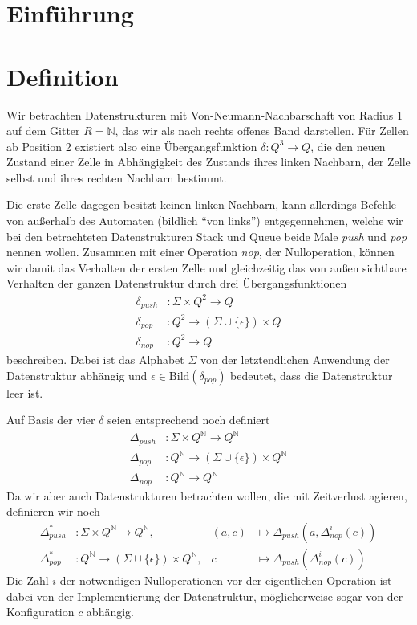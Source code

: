 \documentclass{article}
\begin{document}
\newcommand{\ca}{\ensuremath\mathcal{A}}
\newcommand{\abs}[1]{\lvert#1\rvert}
\newcommand{\ceil}[1]{\lceil#1\rceil}
\newcommand{\zrange}[1]{\mathbb{G}_{#1}}
\newcommand{\bild}[1]{\text{Bild}(#1)}
\newcommand{\N}{\mathbb{N}}

\section{Einführung}

\section{Definition}
Wir betrachten Datenstrukturen mit Von-Neumann-Nachbarschaft von Radius 1 auf dem Gitter $R = \N$, das wir als nach rechts offenes Band darstellen. Für Zellen ab Position 2 existiert also eine Übergangsfunktion $\delta : Q^3 \rightarrow Q$, die den neuen Zustand einer Zelle in Abhängigkeit des Zustands ihres linken Nachbarn, der Zelle selbst und ihres rechten Nachbarn bestimmt.

Die erste Zelle dagegen besitzt keinen linken Nachbarn, kann allerdings Befehle von außerhalb des Automaten (bildlich "`von links"') entgegennehmen, welche wir bei den betrachteten Datenstrukturen Stack und Queue beide Male \emph{push} und \emph{pop} nennen wollen. Zusammen mit einer Operation \emph{nop}, der Nulloperation, können wir damit das Verhalten der ersten Zelle und gleichzeitig das von außen sichtbare Verhalten der ganzen Datenstruktur durch drei Übergangsfunktionen
\begin{align*}
    \delta_{push} &: \Sigma \times Q^2 \rightarrow Q \\
    \delta_{pop} &: Q^2 \rightarrow (\Sigma \cup \{\epsilon\}) \times Q  \\
    \delta_{nop} &: Q^2 \rightarrow Q
\end{align*}
beschreiben. Dabei ist das Alphabet $\Sigma$ von der letztendlichen Anwendung der Datenstruktur abhängig und $\epsilon \in \bild{\delta_{pop}}$ bedeutet, dass die Datenstruktur leer ist.

Auf Basis der vier $\delta$ seien entsprechend noch definiert
\begin{align*}
    \Delta_{push} &: \Sigma \times Q^\N \rightarrow Q^\N \\
    \Delta_{pop} &: Q^\N \rightarrow (\Sigma \cup \{\epsilon\}) \times Q^\N \\
    \Delta_{nop} &: Q^\N \rightarrow Q^\N
\end{align*}
Da wir aber auch Datenstrukturen betrachten wollen, die mit Zeitverlust agieren, definieren wir noch
\begin{align*}
    \Delta^*_{push} &: \Sigma \times Q^\N \rightarrow Q^\N,& (a,c) &\mapsto \Delta_{push}(a,\Delta^i_{nop}(c)) \\
    \Delta^*_{pop} &: Q^\N \rightarrow (\Sigma \cup \{\epsilon\}) \times Q^\N,& c &\mapsto \Delta_{push}(\Delta^i_{nop}(c))
\end{align*}
Die Zahl $i$ der notwendigen Nulloperationen vor der eigentlichen Operation ist dabei von der Implementierung der Datenstruktur, möglicherweise sogar von der Konfiguration $c$ abhängig.
\end{document}
